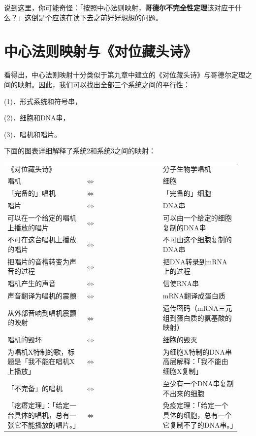 \documentclass[
  12pt,
  twoside,
  openright,
  oldfontcommands,
]{memoir}
\newcommand{\heititext}[1]{{\heifamily\bfseries #1}}
\begin{document}
说到这里，你可能奇怪：「按照中心法则映射，\heititext{哥德尔不完全性定理}该对应于什么？」这倒是个应该在读下去之前好好想想的问题。

\section{中心法则映射与《对位藏头诗》}

看得出，中心法则映射十分类似于第九章中建立的《对位藏头诗》与哥德尔定理之间的映射。因此，我们可以找出全部三个系统之间的平行性：

(1)．形式系统和符号串，

(2)．细胞和DNA串，

(3)．唱机和唱片。

下面的图表详细解释了系统2和系统3之间的映射：

\begin{longtable}[]{>{\raggedright\arraybackslash}p{0.313\linewidth} >{\raggedright\arraybackslash}p{0.313\linewidth} >{\raggedright\arraybackslash}p{0.313\linewidth}}
\toprule\noalign{}
\endhead
\bottomrule\noalign{}
\endlastfoot
《对位藏头诗》 & & 分子生物学唱机 \\
唱机 & $\Leftrightarrow$ & 细胞 \\
「完备的」唱机 & $\Leftrightarrow$ & 「完备的」细胞 \\
唱片 & $\Leftrightarrow$ & DNA串 \\
可以在一个给定的唱机上播放的唱片 & $\Leftrightarrow$ &
可以由一个给定的细胞复制的DNA串 \\
不可在这台唱机上播放的唱片 & $\Leftrightarrow$ & 不可由这个细胞复制的DNA串 \\
把唱片的音槽转变为声音的过程 & $\Leftrightarrow$ & 把DNA转录到mRNA上的过程 \\
唱机产生的声音 & $\Leftrightarrow$ & 信使RNA串 \\
声音翻译为唱机的震颤 & $\Leftrightarrow$ & mRNA翻译成蛋白质 \\
从外部音响到唱机震颤的映射 & $\Leftrightarrow$ &
遗传密码（mRNA三元组到蛋白质的氨基酸的映射） \\
唱机的毁坏 & $\Leftrightarrow$ & 细胞的毁灭 \\
为唱机X特制的歌，标题是「我不能在唱机X上播放」 & $\Leftrightarrow$ &
为细胞X特制的DNA串高层解释：「我不能由细胞X复制」 \\
「不完备」的唱机 & $\Leftrightarrow$ & 至少有一个DNA串复制不出来的细胞 \\
「疙瘩定理」：「给定一台具体的唱机，总有一张它不能播放的唱片。」 & $\Leftrightarrow$ &
免疫定理：「给定一个具体的细胞，总有一个它复制不了的DNA串。」 \\
\end{longtable}
\end{document}
